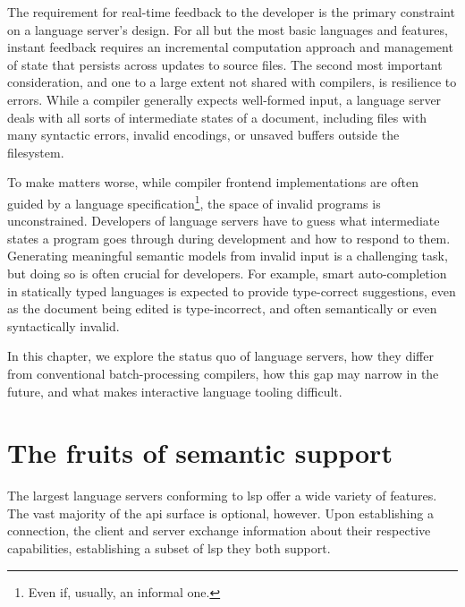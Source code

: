 The requirement for real-time feedback to the developer is the primary
constraint on a language server's design. For all but the most basic languages
and features, instant feedback requires an incremental computation approach and
management of state that persists across updates to source files. The second
most important consideration, and one to a large extent not shared with
compilers, is resilience to errors. While a compiler generally expects
well-formed input, a language server deals with all sorts of intermediate states
of a document, including files with many syntactic errors, invalid encodings, or
unsaved buffers outside the filesystem.

To make matters worse, while compiler frontend implementations are often guided
by a language specification\footnote{Even if, usually, an informal one.}, the
space of invalid programs is unconstrained. Developers of language servers have
to guess what intermediate states a program goes through during development and
how to respond to them. Generating meaningful semantic models from invalid input
is a challenging task, but doing so is often crucial for developers. For
example, smart auto-completion in statically typed languages is expected to
provide type-correct suggestions, even as the document being edited is
type-incorrect, and often semantically or even syntactically invalid.

In this chapter, we explore the status quo of language servers, how they differ
from conventional batch-processing compilers, how this gap may narrow in the
future, and what makes interactive language tooling difficult.

\section{The fruits of semantic support}


The largest language servers conforming to \acrshort{lsp} offer a wide variety
of features. The vast majority of the \acrshort{api} surface is optional,
however. Upon establishing a connection, the client and server exchange
information about their respective capabilities, establishing a subset of
\acrshort{lsp} they both support.

